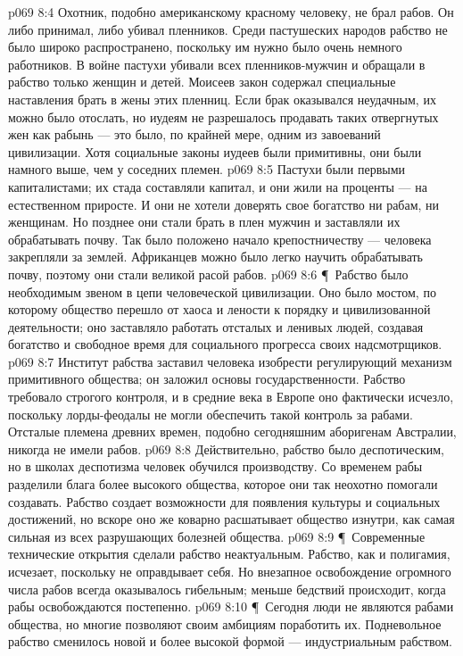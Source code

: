 \vs p069 8:4 Охотник, подобно американскому красному человеку, не брал рабов. Он либо принимал, либо убивал пленников. Среди пастушеских народов рабство не было широко распространено, поскольку им нужно было очень немного работников. В войне пастухи убивали всех пленников\hyp{}мужчин и обращали в рабство только женщин и детей. Моисеев закон содержал специальные наставления брать в жены этих пленниц. Если брак оказывался неудачным, их можно было отослать, но иудеям не разрешалось продавать таких отвергнутых жен как рабынь --- это было, по крайней мере, одним из завоеваний цивилизации. Хотя социальные законы иудеев были примитивны, они были намного выше, чем у соседних племен.
\vs p069 8:5 Пастухи были первыми капиталистами; их стада составляли капитал, и они жили на проценты --- на естественном приросте. И они не хотели доверять свое богатство ни рабам, ни женщинам. Но позднее они стали брать в плен мужчин и заставляли их обрабатывать почву. Так было положено начало крепостничеству --- человека закрепляли за землей. Африканцев можно было легко научить обрабатывать почву, поэтому они стали великой расой рабов.
\vs p069 8:6 \P\ Рабство было необходимым звеном в цепи человеческой цивилизации. Оно было мостом, по которому общество перешло от хаоса и лености к порядку и цивилизованной деятельности; оно заставляло работать отсталых и ленивых людей, создавая богатство и свободное время для социального прогресса своих надсмотрщиков.
\vs p069 8:7 Институт рабства заставил человека изобрести регулирующий механизм примитивного общества; он заложил основы государственности. Рабство требовало строгого контроля, и в средние века в Европе оно фактически исчезло, поскольку лорды\hyp{}феодалы не могли обеспечить такой контроль за рабами. Отсталые племена древних времен, подобно сегодняшним аборигенам Австралии, никогда не имели рабов.
\vs p069 8:8 Действительно, рабство было деспотическим, но в школах деспотизма человек обучился производству. Со временем рабы разделили блага более высокого общества, которое они так неохотно помогали создавать. Рабство создает возможности для появления культуры и социальных достижений, но вскоре оно же коварно расшатывает общество изнутри, как самая сильная из всех разрушающих болезней общества.
\vs p069 8:9 \P\ Современные технические открытия сделали рабство неактуальным. Рабство, как и полигамия, исчезает, поскольку не оправдывает себя. Но внезапное освобождение огромного числа рабов всегда оказывалось гибельным; меньше бедствий происходит, когда рабы освобождаются постепенно.
\vs p069 8:10 \P\ Сегодня люди не являются рабами общества, но многие позволяют своим амбициям поработить их. Подневольное рабство сменилось новой и более высокой формой --- индустриальным рабством.
